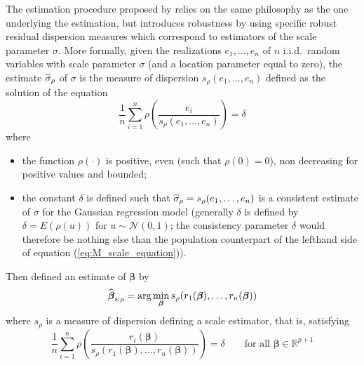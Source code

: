 The  estimation procedure proposed by \citet{rousseeuw:yohai:1984}
relies on the same philosophy as the one underlying the  estimation,
but introduces robustness by using specific robust residual dispersion measures
which correspond to  estimators of the scale parameter $\sigma$. More
formally, given the realizations $e_{1}, \dots, e_{n}$ of $n$ i.i.d.\ random
variables with scale parameter $\sigma$ (and a location parameter equal to
zero), the  estimate $\widehat{\sigma}_{\rho}$ of $\sigma$ is the
measure of dispersion $s_{\rho}(e_{1}, \dots, e_{n})$ defined as the solution
of the equation
%
\begin{equation}\label{eq:M_scale_equation}
    \frac{1}{n}\sum_{i=1}^{n} \rho\left(\frac{e_{i}}{s_{\rho}(e_{1}, \dots, e_{n})}\right) = \delta
\end{equation}
%
where
\begin{itemize}
    \item the function $\rho(\cdot)$ is positive, even (such that
    $\rho(0) = 0$), non decreasing for positive values and bounded;

    \item the constant $\delta$ is defined such that $\widehat{\sigma}_{\rho} =
    s_{\rho}(e_{1}, \dots, e_{n})$ is a consistent estimate of $\sigma$ for the
    Gaussian regression model (generally $\delta$ is defined by $\delta =
    E(\rho(u))$ for $u \sim \mathcal{N}(0,1)$; the consistency parameter
    $\delta$ would therefore be nothing else than the population counterpart of
    the lefthand side of equation (\ref{eq:M_scale_equation})).
\end{itemize}

Then \citet{rousseeuw:yohai:1984} defined an  estimate of
$\boldsymbol\beta$ by
\[
    \sthat{\boldsymbol\beta}_{\stsc{S};\rho} 
    = \arg\min_{\boldsymbol\beta}s_{\rho} (r_{1}(\boldsymbol\beta), \dots, r_{n}(\boldsymbol{\beta}))
\]
where $s_{\rho}$ is a measure of dispersion defining a scale  estimator, that is,
satisfying
%
\begin{equation}\label{eq:M_scale_equation_res}
    \frac{1}{n}\sum_{i=1}^{n} \rho\left(\frac{r_{i}(\boldsymbol{\beta})}%
        {s_{\rho}(r_{1}(\boldsymbol\beta), \dots, r_{n}(\boldsymbol\beta))}\right) = \delta
    \qquad\text{for all $\boldsymbol\beta \in \mathbb{R}^{p+1}$}
\end{equation}


